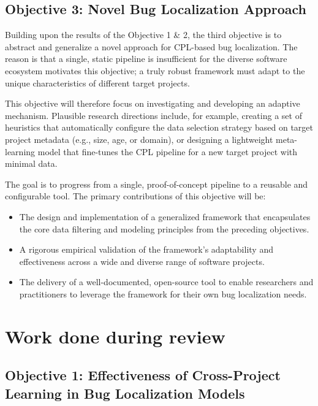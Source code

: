 \documentclass[12pt,table,xcdraw]{article}
\begin{document}
\subsection{Objective 3: Novel Bug Localization Approach}
\label{subsec: obj3}
Building upon the results of the Objective 1 \& 2, the third objective is to abstract and generalize a novel approach for CPL-based bug localization. The reason is that a single, static pipeline is insufficient for the diverse software ecosystem motivates this objective; a truly robust framework must adapt to the unique characteristics of different target projects.

This objective will therefore focus on investigating and developing an adaptive mechanism. Plausible research directions include, for example, creating a set of heuristics that automatically configure the data selection strategy based on target project metadata (e.g., size, age, or domain), or designing a lightweight meta-learning model that fine-tunes the CPL pipeline for a new target project with minimal data.

The goal is to progress from a single, proof-of-concept pipeline to a reusable and configurable tool. The primary contributions of this objective will be:
\begin{itemize}
    \item The design and implementation of a generalized framework that encapsulates the core data filtering and modeling principles from the preceding objectives.
    \item A rigorous empirical validation of the framework's adaptability and effectiveness across a wide and diverse range of software projects.
    \item The delivery of a well-documented, open-source tool to enable researchers and practitioners to leverage the framework for their own bug localization needs.
\end{itemize}


\section{Work done during review}
\subsection{Objective 1: Effectiveness of Cross-Project Learning in Bug Localization Models}
\label{subsec:objecive1_plan}
\end{document}
